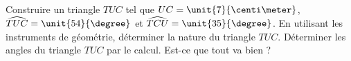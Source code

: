
\begin{exercice}\label{exosmath-0780}

Construire un triangle \( TUC\) tel que \( UC=\unit{7}{\centi\meter}\), \( \widehat{TUC}=\unit{54}{\degree}\) et \( \widehat{TCU}=\unit{35}{\degree}\). En utilisant les instruments de géométrie, déterminer la nature du triangle \( TUC\). Déterminer les angles du triangle \( TUC\) par le calcul. Est-ce que tout va bien ?

\end{exercice}
